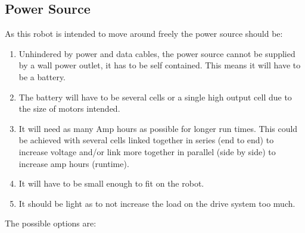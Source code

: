 \subsection{Power Source}
As this robot is intended to move around freely the power source should be:
\begin{enumerate}
\item Unhindered by power and data cables, the power source cannot be supplied by a wall power outlet, it has to be self contained.  This means it will have to be a battery.
\item The battery will have to be several cells or a single high output cell due to the size of motors intended.
\item It will need as many Amp hours as possible for longer run times.  This could be achieved with several cells linked together in series (end to end) to increase voltage and/or link more together in parallel (side by side) to increase amp hours (runtime).
\item It will have to be small enough to fit on the robot.
\item It should be light as to not increase the load on the drive system too much.
\end{enumerate}
The possible options are:
